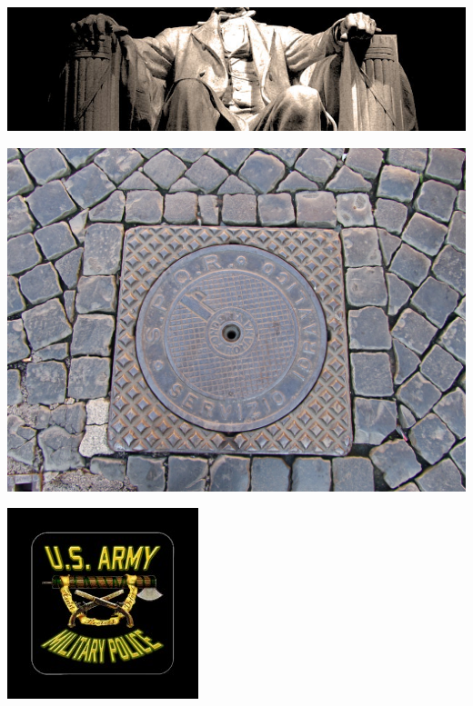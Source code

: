 \begin{frame}
    \centering
    \includegraphics[width=.9\textwidth]{img/fasces/lincoln_fasces.jpg} \\
\end{frame}
\begin{frame}
    \centering
    \includegraphics[width=.9\textwidth]{img/fasces/manhole.JPG} \\
\end{frame}
\begin{frame}
    \centering
    \includegraphics[width=.9\textwidth]{img/fasces/mp.jpg} \\
\end{frame}
